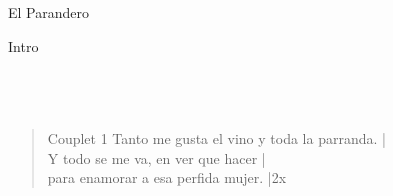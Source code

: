 \begin{song}{El Parandero}

\begin{instrumental}{Intro}
   \measure*{}\\
   \\
 \measure{}  \measure*{}\\
   \\
\end{instrumental}

\begin{verse}{Couplet 1}
Tanto me gusta el vino y toda la parranda. \hspace{1em}|\\
Y todo se me va, en ver que hacer \hspace{4.35em}|\\
para enamorar a esa perfida mujer. \hspace{1em}  \hspace{2.4em}|\hspace{1em}2x
\end{verse}


\end{song}
